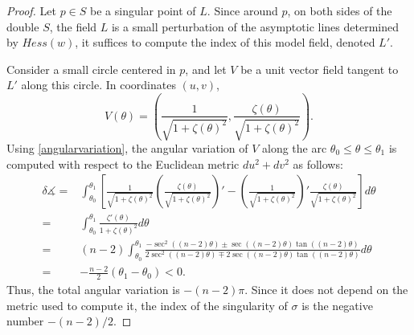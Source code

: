 \documentclass[11pt,reqno]{amsart}
\newtheorem{lemma}[theorem]{Lemma}
\begin{document}
\begin{proof}
    Let $p\in S$ be a singular point of $L$. Since around $p$, on both sides of the double $S$, the field $L$ is a small perturbation of the asymptotic lines determined by $Hess(w)$, it suffices to compute the index of this model field, denoted $L'$. 

    Consider a small circle centered in $p$, and let $V$ be a unit vector field tangent to $L'$ along this circle. In coordinates $(u,v)$,
    \begin{equation*}
        V(\theta)=\left( \frac{1}{\sqrt{1+\zeta(\theta)^2}},\frac{\zeta(\theta)}{\sqrt{1+\zeta(\theta)^2}}\right).
    \end{equation*}
    Using \eqref{angularvariation}, the angular variation of $V$ along the arc $\theta_0\leq\theta\leq\theta_1$ is computed with respect to the Euclidean metric $du^2+dv^2$ as follows:
    \begin{align*}
        \delta\measuredangle= & \int_{\theta_0}^{\theta_1}\left[\frac{1}{\sqrt{1+\zeta(\theta)^2}}\left(\frac{\zeta(\theta)}{\sqrt{1+\zeta(\theta)^2}}\right)'-\left(\frac{1}{\sqrt{1+\zeta(\theta)^2}}\right)'\frac{\zeta(\theta)}{\sqrt{1+\zeta(\theta)^2}}\right]d\theta \\
        = & \int_{\theta_0}^{\theta_1} \frac{\zeta'(\theta)}{1+\zeta(\theta)^2}d\theta \\
        = & (n-2)\int_{\theta_0}^{\theta_1}\frac{-\sec^2((n-2)\theta)\pm \sec((n-2)\theta)\tan((n-2)\theta)}{2\sec^2((n-2)\theta)\mp2\sec((n-2)\theta)\tan((n-2)\theta)}d\theta \\
        = & -\frac{n-2}{2}(\theta_1-\theta_0)<0.
    \end{align*}
    Thus, the total angular variation is $-(n-2)\pi$. Since it does not depend on the metric used to compute it, the index of the singularity of $\sigma$ is the negative number $-(n-2)/2$.
\end{proof}



\end{document}
